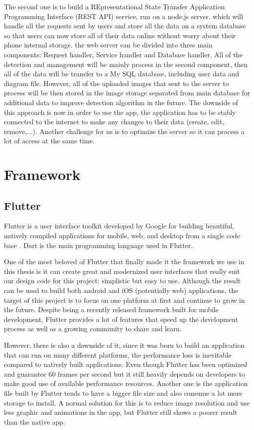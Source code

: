 The second one is to build a REpresentational State Transfer Application Programming Interface (REST API) service, run on a node.js server, which will handle all the requests sent by users and store all the data on a system database so that users can now store all of their data online without worry about their phone internal storage. the web server can be divided into three main components: Request handler, Service handler and Database handler. All of the detection and management will be mainly process in the second component, then all of the data will be transfer to a My SQL database, including user data and diagram file. However, all of the uploaded images that sent to the server to process will be then stored in the image storage separated from main database for additional data to improve detection algorithm in the future. The downside of this approach is now in order to use the app, the application has to be stably connected to the internet to make any changes to their data (create, edit, remove,...). Another challenge for us is to optimize the server so it can process a lot of access at the same time.



\section{Framework}
\subsection{Flutter}
Flutter is a user interface toolkit developed by Google for building beautiful, natively compiled applications for mobile, web, and desktop from a single code base \cite{57}. Dart is the main programming language used in Flutter.

One of the most beloved of Flutter that finally made it the framework we use in this thesis is it can create great and modernized user interfaces that really suit our design code for this project: simplistic but easy to use. Although the result can be used to build both android and iOS (potentially web) applications, the target of this project is to focus on one platform at first and continue to grow in the future. Despite being a recently released framework built for mobile development, Flutter provides a lot of features that speed up the development process as well as a growing community to share and learn.

However, there is also a downside of it, since it was born to build an application that can run on many different platforms, the performance loss is inevitable compared to natively built applications. Even though Flutter has been optimized and guarantee 60 frames per second but it still heavily depends on developers to make good use of available performance resources. Another one is the application file built by Flutter tends to have a bigger file size and also consume a lot more storage to install. A normal solution for this is to reduce image resolution and use less graphic and animations in the app, but Flutter still shows a poorer result than the native app.

